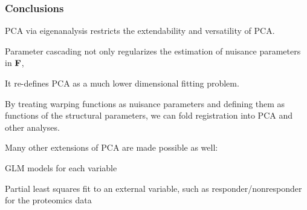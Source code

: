 \documentclass[11pt]{beamer}
\begin{document}
\begin{frame}

\frametitle{Conclusions}

\bi
  \item PCA via eigenanalysis restricts the extendability and versatility of PCA.
  \item Parameter cascading not only regularizes the estimation of nuisance parameters in $\mbox{\bf F}$,
  \item It re-defines PCA as a much lower dimensional fitting problem.
  \item By treating warping functions as nuisance parameters and defining them as functions of the structural parameters, we can fold registration into PCA and other analyses.
  \item Many other extensions of PCA are made possible as well:
  \bi
    \item GLM models for each variable
    \item Partial least squares fit to an external variable, such as responder/nonresponder for the proteomics data
  \ei
\ei

\end{frame}
\end{document}
